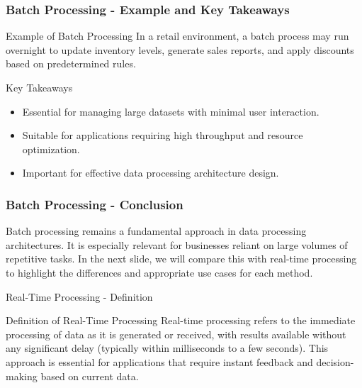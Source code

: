 \documentclass[aspectratio=169]{beamer}
\begin{document}
\begin{frame}[fragile]
    \frametitle{Batch Processing - Example and Key Takeaways}
    \begin{block}{Example of Batch Processing}
        In a retail environment, a batch process may run overnight to update inventory levels, generate sales reports, and apply discounts based on predetermined rules.
    \end{block}

    \begin{block}{Key Takeaways}
        \begin{itemize}
            \item Essential for managing large datasets with minimal user interaction.
            \item Suitable for applications requiring high throughput and resource optimization.
            \item Important for effective data processing architecture design.
        \end{itemize}
    \end{block}
\end{frame}

\begin{frame}[fragile]
    \frametitle{Batch Processing - Conclusion}
    Batch processing remains a fundamental approach in data processing architectures. It is especially relevant for businesses reliant on large volumes of repetitive tasks. 
    \newline 
    In the next slide, we will compare this with real-time processing to highlight the differences and appropriate use cases for each method.
\end{frame}

\begin{frame}[fragile]{Real-Time Processing - Definition}
    \begin{block}{Definition of Real-Time Processing}
        Real-time processing refers to the immediate processing of data as it is generated or received, with results available without any significant delay (typically within milliseconds to a few seconds). This approach is essential for applications that require instant feedback and decision-making based on current data.
    \end{block}
\end{frame}
\end{document}

